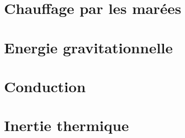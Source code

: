 \documentclass[a4paper,DIV16,10pt]{scrartcl}
\begin{document}
 \inidoc


\newpage
\section{Chauffage par les marées}


\newpage
\section{Energie gravitationnelle}


\newpage
\section{Conduction}


\newpage
\section{Inertie thermique}

\end{document}
